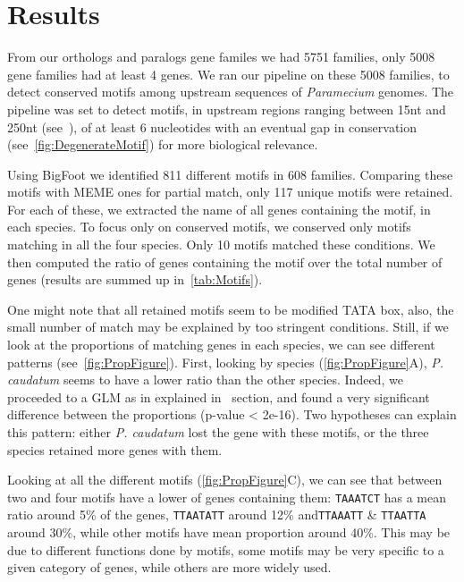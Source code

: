 \section*{Results}
\label{sec:Results}

From our orthologs and paralogs gene familes we had 5751 families, only 5008 gene families had at least 4 genes. We ran our pipeline on these 5008 families, to detect conserved motifs among upstream sequences of \textit{Paramecium} genomes. The pipeline was set to detect motifs, in upstream regions ranging between 15nt and 250nt (see~), of at least 6 nucleotides with an eventual gap in conservation (see~\autoref{fig:DegenerateMotif}) for more biological relevance.

Using BigFoot we identified 811 different motifs in 608 families. Comparing these motifs with MEME ones for partial match, only 117 unique motifs were retained. For each of these, we extracted the name of all genes containing the motif, in each species. To focus only on conserved motifs, we conserved only motifs matching in all the four species. Only 10 motifs matched these conditions. We then computed the ratio of genes containing the motif over the total number of genes (results are summed up in~\autoref{tab:Motifs}).

One might note that all retained motifs seem to be modified TATA box, also, the small number of match may be explained by too stringent conditions. Still, if we look at the proportions of matching genes in each species, we can see different patterns (see~\autoref{fig:PropFigure}). First, looking by species (\autoref{fig:PropFigure}A), \textit{P. caudatum} seems to have a lower ratio than the other species. Indeed, we proceeded to a GLM as in explained in~ section, and found a very significant difference between the proportions (p-value < 2e-16). Two hypotheses can explain this pattern: either \textit{P. caudatum} lost the gene with these motifs, or the three  species retained more genes with them.

Looking at all the different motifs (\autoref{fig:PropFigure}C), we can see that between two and four motifs have a lower of genes containing them: \texttt{TAAATCT} has a mean ratio around 5\% of the genes, \texttt{TTAATATT} around 12\% and\texttt{TTAAATT} \& \texttt{TTAATTA} around 30\%, while other motifs have mean proportion around 40\%. This may be due to different functions done by motifs, some motifs may be very specific to a given category of genes, while others are more widely used.

